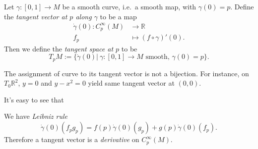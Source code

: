 \begin{defn}
    Let $\gamma:[0,1]\to M$ be a smooth curve, i.e.\ a smooth map, with $\gamma(0)=p$.
    Define the \emph{tangent vector at $p$ along $\gamma$} to be a map
    \begin{align*}
        \dot\gamma(0):C^\infty_p(M)&\to\mathbb{R}\\
        f_p&\mapsto(f\circ\gamma)'(0).
    \end{align*}
    Then we define the \emph{tangent space at $p$} to be
    \[T_pM:=\{\dot\gamma(0)|\ \gamma:[0,1]\to M\text{ smooth, }\gamma(0)=p\}.\]
\end{defn}

\begin{rem}
    The assignment of curve to its tangent vector is not a bijection.
    For instance, on $T_0\mathbb{R}^2$, $y=0$ and $y-x^2=0$ yield same tangent vector at $(0,0)$.
\end{rem}

It's easy to see that
\begin{prop}
    We have \emph{Leibniz rule} 
    \[\dot\gamma(0)(f_pg_p)=f(p)\dot\gamma(0)(g_p)+g(p)\dot\gamma(0)(f_p).\]
    Therefore a tangent vector is a \emph{derivative} on $C^\infty_p(M)$.
\end{prop}

